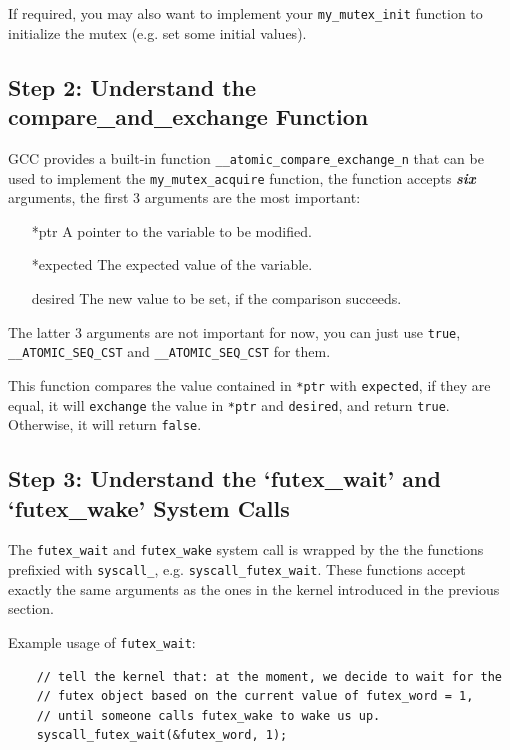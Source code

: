 If required, you may also want to implement your \texttt{my\_mutex\_init} function to initialize
the mutex (e.g. set some initial values).

\subsection{Step 2: Understand the compare\_and\_exchange Function}

GCC provides a built-in function \texttt{\_\_atomic\_compare\_exchange\_n} that
can be used to implement the \texttt{my\_mutex\_acquire} function, the function accepts
\textit{\textbf{six}} arguments, the first 3 arguments are the most important:

\begin{itemize}
    \item[*ptr] A pointer to the variable to be modified.
    \item[*expected] The expected value of the variable.
    \item[desired] The new value to be set, if the comparison succeeds.
\end{itemize}

The latter 3 arguments are not important for now, you can just use \texttt{true},
\texttt{\_\_ATOMIC\_SEQ\_CST} and \texttt{\_\_ATOMIC\_SEQ\_CST} for them.

This function compares the value contained in \texttt{*ptr} with \texttt{expected}, if they
are equal, it will \texttt{exchange} the value in \texttt{*ptr} and \texttt{desired}, and
return \texttt{true}. Otherwise, it will return \texttt{false}.

\subsection{Step 3: Understand the `futex\_wait' and `futex\_wake' System Calls}

The \texttt{futex\_wait} and \texttt{futex\_wake} system call is wrapped by the
the functions prefixied with \texttt{syscall\_}, e.g. \texttt{syscall\_futex\_wait}.
These functions accept exactly the same arguments as the ones in the kernel introduced
in the previous section.

Example usage of \texttt{futex\_wait}:

\begin{verbatim}
    // tell the kernel that: at the moment, we decide to wait for the
    // futex object based on the current value of futex_word = 1,
    // until someone calls futex_wake to wake us up.
    syscall_futex_wait(&futex_word, 1);
\end{verbatim}

